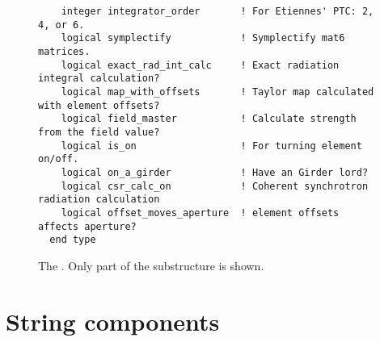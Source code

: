 \begin{figure}[htb]
\begin{verbatim}
    integer integrator_order       ! For Etiennes' PTC: 2, 4, or 6.
    logical symplectify            ! Symplectify mat6 matrices.
    logical exact_rad_int_calc     ! Exact radiation integral calculation?
    logical map_with_offsets       ! Taylor map calculated with element offsets?
    logical field_master           ! Calculate strength from the field value?
    logical is_on                  ! For turning element on/off.
    logical on_a_girder            ! Have an Girder lord?
    logical csr_calc_on            ! Coherent synchrotron radiation calculation
    logical offset_moves_aperture  ! element offsets affects aperture?
  end type
\end{verbatim}
\caption[The .]{The . Only part of the 
  substructure is shown.}
\label{f:ele.struct}
\end{figure}

\section{String components}

